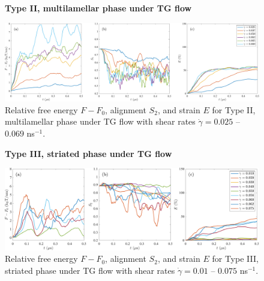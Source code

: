 \begin{figure}[h!]
\begin{center}
\textbf{Type II, multilamellar phase under TG flow}\par\medskip
\includegraphics[width=\textwidth]{SMFigures/MLTGRaw.pdf}
\end{center}
\caption{
Relative free energy $F - F_0$,
alignment $S_2$, and strain $E$ for
Type II, multilamellar phase under TG flow with shear rates $\dot\gamma=0.025$ -- $0.069$ ns$^{-1}$.
}
\label{fig:mltgraw}
\end{figure}


\begin{figure}[h!]
\begin{center}
\textbf{Type III, striated phase under TG flow}\par\medskip
\includegraphics[width=\textwidth]{SMFigures/StTGRaw.pdf}
\end{center}
\caption{
Relative free energy $F - F_0$,
alignment $S_2$, and strain $E$ for
Type III, striated phase under TG flow with shear rates $\dot\gamma=0.01$ -- $0.075$ ns$^{-1}$.
}
\label{fig:sttgraw}
\end{figure}




